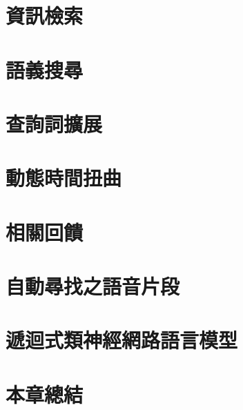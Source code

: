 \section{資訊檢索}

\section{語義搜尋}

\section{查詢詞擴展}

\section{動態時間扭曲}

\section{相關回饋}

\section{自動尋找之語音片段}

\section{遞迴式類神經網路語言模型}

\section{本章總結}
